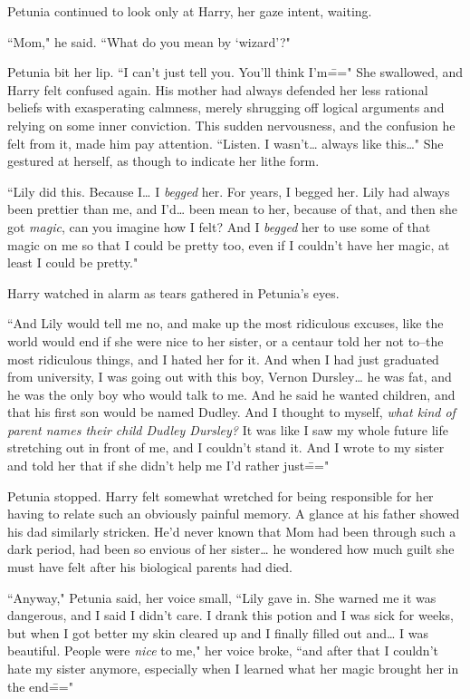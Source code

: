 Petunia continued to look only at Harry, her gaze intent, waiting.

``Mom," he said. ``What do you mean by `wizard'?"

Petunia bit her lip. ``I can't just tell you. You'll think I'm\===" She swallowed, and Harry felt confused again. His mother had always defended her less rational beliefs with exasperating calmness, merely shrugging off logical arguments and relying on some inner conviction. This sudden nervousness, and the confusion he felt from it, made him pay attention. ``Listen. I wasn't{\ldots} always like this{\ldots}" She gestured at herself, as though to indicate her lithe form.

``Lily did this. Because I{\ldots} I \emph{begged} her. For years, I begged her. Lily had always been prettier than me, and I'd{\ldots} been mean to her, because of that, and then she got \emph{magic}, can you imagine how I felt? And I \emph{begged} her to use some of that magic on me so that I could be pretty too, even if I couldn't have her magic, at least I could be pretty."

Harry watched in alarm as tears gathered in Petunia's eyes.

``And Lily would tell me no, and make up the most ridiculous excuses, like the world would end if she were nice to her sister, or a centaur told her not to\---the most ridiculous things, and I hated her for it. And when I had just graduated from university, I was going out with this boy, Vernon Dursley{\ldots} he was fat, and he was the only boy who would talk to me. And he said he wanted children, and that his first son would be named Dudley. And I thought to myself, \emph{what kind of parent names their child Dudley Dursley?} It was like I saw my whole future life stretching out in front of me, and I couldn't stand it. And I wrote to my sister and told her that if she didn't help me I'd rather just\==="

Petunia stopped. Harry felt somewhat wretched for being responsible for her having to relate such an obviously painful memory. A glance at his father showed his dad similarly stricken. He'd never known that Mom had been through such a dark period, had been so envious of her sister{\ldots} he wondered how much guilt she must have felt after his biological parents had died.

``Anyway," Petunia said, her voice small, ``Lily gave in. She warned me it was dangerous, and I said I didn't care. I drank this potion and I was sick for weeks, but when I got better my skin cleared up and I finally filled out and{\ldots} I was beautiful. People were \emph{nice} to me," her voice broke, ``and after that I couldn't hate my sister anymore, especially when I learned what her magic brought her in the end\==="

